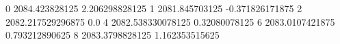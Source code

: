 0 2084.423828125 2.206298828125
1 2081.845703125 -0.371826171875
2 2082.217529296875 0.0
4 2082.538330078125 0.32080078125
6 2083.0107421875 0.793212890625
8 2083.3798828125 1.162353515625
